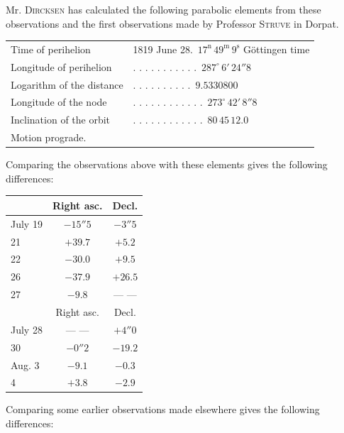 \par\indent Mr. \textsc{Dircksen} has calculated the following parabolic elements from these observations and the first observations made by Professor \textsc{Struve} in Dorpat.

\begin{center}
\begin{tabular}{ll}
Time of perihelion & 1819 June 28.\ $17^{\mathrm n}\,49^{\mathrm m}\,9^{\mathrm s}$ Göttingen time \\
Longitude of perihelion & . . . . . . . . . . .\ $287^\circ\,6'\,24''8$ \\
Logarithm of the distance & . . . . . . . . . .\ $9.5330800$ \\
Longitude of the node & . . . . . . . . . . . .\ $273^\circ\,42'\,8''8$ \\
Inclination of the orbit & . . . . . . . . . . . .\ $80\,45\,12.0$ \\
\multicolumn{2}{l}{Motion prograde.}
\end{tabular}
\end{center}

\par\indent Comparing the observations above with these elements gives the following differences:

\begin{center}
\begin{tabular}{l|c|c}
 &  Right asc.  &  Decl.  \\
\hline
July 19  &  $-15''5$  &  $-3''5$  \\
21  &  $+39.7$  &  $+5.2$  \\
22  &  $-30.0$  &  $+9.5$  \\
26  &  $-37.9$  &  $+26.5$  \\
27  &  $-9.8$  &  --- ---  \\
\hline
  &  Right asc.  &  Decl.  \\
\hline
 July 28  &  --- ---  &  $+4''0$  \\
 30  &  $-0''2$  &  $-19.2$  \\
 Aug. 3  &  $-9.1$  &  $-0.3$  \\
 4  &  $+3.8$  &  $-2.9$  \\
\end{tabular}
\end{center}

\par\indent Comparing some earlier observations made elsewhere gives the following differences:

